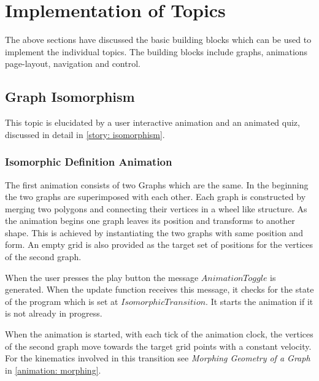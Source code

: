 \section{Implementation of Topics}
The above sections have discussed the basic building blocks which can be used
to implement the individual topics. The building blocks include graphs, animations
page-layout, navigation and control.

\subsection{Graph Isomorphism}
\label{impl: isomporphism}

This topic is elucidated by a user interactive animation and an animated quiz, discussed in detail in \autoref{story: isomorphism}. 


\subsubsection{Isomorphic Definition Animation}
The first animation consists of two Graphs which are the same.  In the
beginning the two graphs are superimposed with each other.  Each
graph is constructed by merging two polygons and connecting their vertices in a
wheel like structure. As the animation begins one graph leaves its position
and transforms to another shape.  This is achieved by instantiating the two
graphs with same position and form. An empty grid is also provided as the
target set of positions for the vertices of the second graph. 

When the user presses the play button the message $AnimationToggle$ is
generated. When the update function receives this message, it checks for the
state of the program which is set at $IsomorphicTransition$. It starts the
animation if it is not already in progress.  

When the animation is started, with each tick of the animation clock, the
vertices of the second graph move towards the target grid points with a
constant velocity. For the kinematics involved in this transition see
\emph{Morphing Geometry of a Graph} in \autoref{animation: morphing}.

